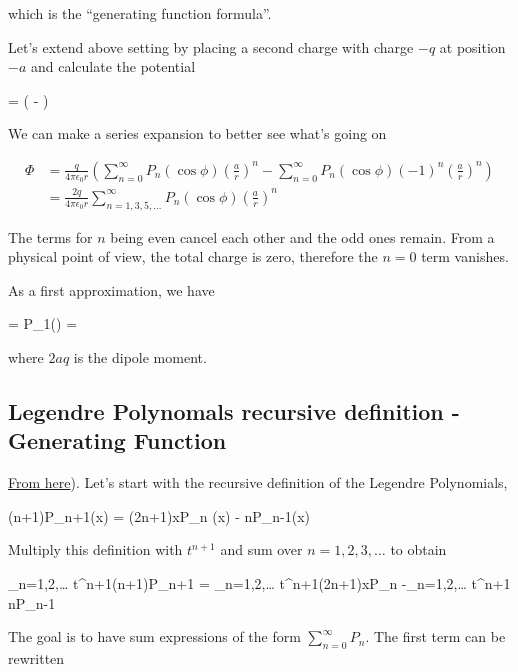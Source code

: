 which is the ``generating function formula''.

Let's extend above setting by placing a second charge with charge $-q$ at position $-a$ and calculate the potential

\bee
\Phi =  \left(  -  \right)
\eee

We can make a series expansion to better see what's going on

\begin{align*}
  \Phi &= \frac{q}{4\pi\epsilon_0 r} \left( \sum_{n=0}^\infty P_n(\cos\phi)\left(\frac{a}{r} \right)^n - \sum_{n=0}^\infty P_n(\cos\phi) (-1)^n \left(\frac{a}{r} \right)^n \right) \\
  &= \frac{2q}{4\pi\epsilon_0 r} \sum_{n=1,3,5,\ldots}^\infty P_n(\cos\phi)\left(\frac{a}{r} \right)^n
\end{align*}

The terms for $n$ being even cancel each other and the odd ones remain. From a physical point of view, the total charge is zero, therefore the $n=0$ term vanishes.

As a first approximation, we have

\bee
\Phi =  P_1(\cos\phi)  =  \cos\phi
\eee

where $2aq$ is the dipole moment.


\subsection{Legendre Polynomals recursive definition - Generating Function}

\href{https://math.stackexchange.com/questions/1611224/calculating-i-int-11-dfrac1-sqrt1-xp-nx-dx-where-p-n-is-a?rq=1}{From here}). Let's start with the recursive definition of the Legendre Polynomials,

\bee
(n+1)P_{n+1}(x) = (2n+1)xP_n (x) - nP_{n-1}(x)
\eee

Multiply this definition with $t^{n+1}$ and sum over $n=1,2,3,\ldots$ to obtain

\bee
\sum_{n=1,2,\ldots} t^{n+1}(n+1)P_{n+1} = \sum_{n=1,2,\ldots} t^{n+1}(2n+1)xP_n -\sum_{n=1,2,\ldots} t^{n+1} nP_{n-1}
\eee

The goal is to have sum expressions of the form $\sum_{n=0}^\infty P_n$. The first term can be rewritten

